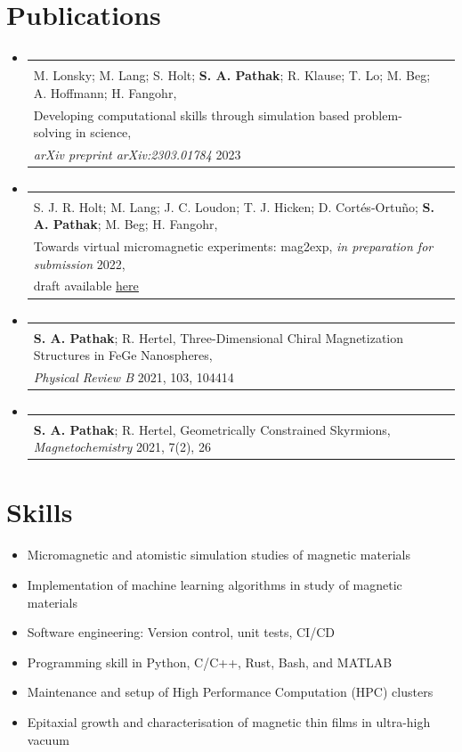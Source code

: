 \documentclass[A4,11pt]{article}
\makeatletter
\newcommand{\CVSubheading}[4]{
  \vspace{-2pt}\item
    \begin{tabular*}{0.97\textwidth}[t]{l@{\extracolsep{\fill}}r}
      \textbf{#1} & #2 \\
      \small#3 & \small #4 \\
    \end{tabular*}\vspace{-7pt}
}
\newcommand{\CVSubHeadingListStart}{\begin{itemize}[leftmargin=0.5cm, label={}]}
\newcommand{\CVSubHeadingListEnd}{\end{itemize}}
\makeatother
\begin{document}
\section{Publications}
  \CVSubHeadingListStart
    \CVSubheading
      {}{}
      {M. Lonsky; M. Lang; S. Holt; \textbf{S. A. Pathak}; R. Klause; T. Lo; M.
        Beg; A. Hoffmann; H. Fangohr,\\ Developing computational skills through
        simulation based problem-solving in science,
        \\ \textit{arXiv preprint arXiv:2303.01784} 2023}{}
    \CVSubheading
      {}{}
      {S. J. R. Holt; M. Lang; J. C. Loudon; T. J. Hicken; D. Cortés-Ortuño;
        \textbf{S. A. Pathak}; M. Beg; H. Fangohr,\\
        Towards virtual micromagnetic experiments: mag2exp, \textit{in
        preparation for submission} 2022,\\ draft available
        \href{https://s.gwdg.de/8QRRcD}{\color{blue} \underline{here}}}{}
    \CVSubheading
      {}{}
      {\textbf{S. A. Pathak}; R. Hertel, Three-Dimensional Chiral Magnetization Structures in FeGe
        Nanospheres,\\ \textit{Physical Review B} 2021, 103, 104414}{}
    \CVSubheading
      {}{}
      {\textbf{S. A. Pathak}; R. Hertel, Geometrically Constrained Skyrmions,
        \textit{Magnetochemistry} 2021, 7(2), 26}{}
  \CVSubHeadingListEnd

\section{Skills}
\begin{itemize}
  \item Micromagnetic and atomistic simulation studies of magnetic materials
  \item Implementation of machine learning algorithms in study of magnetic
    materials
  \item Software engineering: Version control, unit tests, CI/CD
  \item Programming skill in Python, C/C++, Rust, Bash, and MATLAB
  \item Maintenance and setup of High Performance Computation (HPC) clusters
  \item Epitaxial growth and characterisation of magnetic thin films in
    ultra-high vacuum
\end{itemize}
\end{document}
